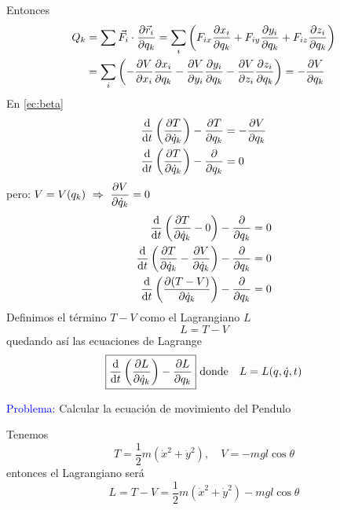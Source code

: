 \documentclass[../main]{subfiles}
\begin{document}
Entonces
\begin{equation}
    \begin{split}
        Q_k&=\sum \vec{F}_i \cdot \pdv{\vec{r}_i}{q_k}=\sum_i \left(F_{ix}\pdv{x_i}{q_k}+F_{iy}\pdv{y_i}{q_k}+F_{iz}\pdv{z_i}{q_k}\right)\\
        &=\sum_i \left(-\pdv{V}{x_i}\pdv{x_i}{q_k}-\pdv{V}{y_i}\pdv{y_i}{q_k}-\pdv{V}{z_i}\pdv{z_i}{q_k}\right)=-\pdv{V}{q_k}
    \end{split}
\end{equation}
En \eqref{ec:beta}
\begin{equation}
    \begin{split}
        \dv{}{t}\left(\pdv{T}{\dot{q}_k}\right)-\pdv{T}{q_k}&=-\pdv{V}{q_k}\\
        \dv{}{t}\left(\pdv{T}{\dot{q}_k}\right)-\pdv{}{q_k}(T-V)&=0
    \end{split}
\end{equation}
pero: $\displaystyle V=V(q_k) \ \Rightarrow \ \pdv{V}{\dot{q}_k}=0$
\begin{equation}
    \begin{split}
        \dv{}{t}\left(\pdv{T}{\dot{q}_k}-0\right)-\pdv{}{q_k}(T-V)&=0\\
        \dv{}{t}\left(\pdv{T}{\dot{q}_k}-\pdv{V}{\dot{q}_k}\right)-\pdv{}{q_k}(T-V)&=0\\
        \dv{}{t}\left(\pdv{(T-V)}{\dot{q}_k}\right)-\pdv{}{q_k}(T-V)&=0    
    \end{split}
\end{equation}
Definimos el término $T-V$ como el Lagrangiano $L$
\begin{equation}
    L=T-V
\end{equation}
quedando así las ecuaciones de Lagrange
\begin{equation}
    \boxed{\dv{}{t}\left(\pdv{L}{\dot{q}_k}\right)-\pdv{L}{q_k}} \ \text{donde}\quad L=L(q,\dot{q},t)
\end{equation}

\textcolor{blue}{Problema:} Calcular la ecuación de movimiento del Pendulo

Tenemos 
\begin{equation*}
    T=\dfrac{1}{2}m(\dot{x}^2+\dot{y}^2), \quad V=-mgl\cos \theta
\end{equation*}
entonces el Lagrangiano será
\begin{equation*}
    L=T-V=\dfrac{1}{2}m(\dot{x}^2+\dot{y}^2)-mgl\cos \theta
\end{equation*}
\end{document}
